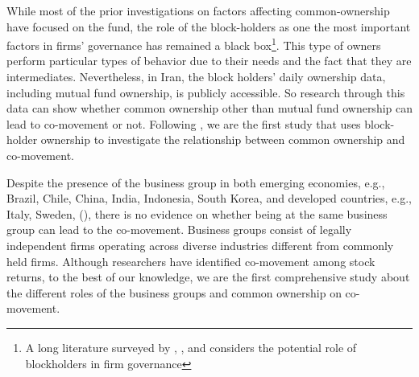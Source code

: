 	While most of the prior investigations on factors affecting common-ownership have focused on the fund, the role of the block-holders as one the most important factors in firms' governance has remained a black box\footnote{A long literature surveyed by \cite{holderness2003survey}, \cite{edmans2014blockholders}, and \cite{edmans2017blockholders} considers the potential role of blockholders in firm governance}.  This type of owners perform particular types of behavior due to their needs and the fact that they are intermediates.
		Nevertheless, in Iran, the block holders' daily ownership data, including mutual fund ownership, is publicly accessible. So research through this data can show whether common ownership other than mutual fund ownership can lead to co-movement or not. Following \cite{AntonPolk}, we are the first study that uses block-holder ownership to investigate the relationship between common ownership and co-movement.
		
Despite the presence of the business group in both emerging economies, e.g., Brazil, Chile, China, India, Indonesia, South Korea, and developed countries, e.g., Italy, Sweden, (\cite{khanna2007business}), there is no evidence on whether being at the same business group can lead to the co-movement. Business groups consist of legally independent firms operating across diverse industries different from commonly held firms. Although researchers have identified co-movement among stock
returns,  to the best of our knowledge, we are the first comprehensive study about the different roles of the business groups and common ownership on co-movement. 







%	
%	
	
